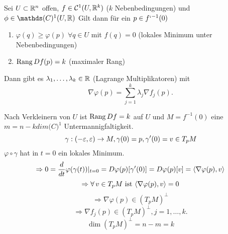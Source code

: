\documentclass[../ana2.tex]{subfiles}
\begin{document}
\begin{satz}
    Sei \( U \subset \mathbb{R}^n \) offen, \( f \in \mathcal{C}^1(U, \mathbb{R}^k) \) 
    (\(k\) Nebenbedingungen) und \(\phi \in \mathds(C)^1(U, \R)\)
    Gilt dann für ein \(p \in f`^{-1}(0)\)
    \begin{enumerate}
        \item \( \varphi(q) \geq \varphi(p) \;\forall q \in U \) mit
        \( f(q) = 0 \) (lokales Minimum unter Nebenbedingungen)
        \item \( \operatorname{Rang} Df (p) = k \) (maximaler Rang)
    \end{enumerate}
    Dann gibt es \( \lambda_1, \ldots, \lambda_k \in \mathbb{R} \) (Lagrange Multiplikatoren)
    mit 
    \[ \nabla \varphi(p) = \sum_{j=1}^k \lambda_j \nabla f_j(p). \]
\end{satz}
\begin{bew}
    Nach Verkleinern von \(U\) ist \(\operatorname{Rang} Df = k \) 
    auf \(U\) und \(M = f^{-1}(0)\) eine
    \(m=n-k dim \mathcal(C)^1\) Untermannigfaltigkeit.
    \[ \gamma:(-\varepsilon, \varepsilon)\rightarrow M, \gamma(0) = p, \gamma'(0) = v \in T_pM \]
    \( \varphi \circ \gamma \) hat in \( t = 0 \) ein lokales Minimum.
    \[ \Rightarrow 0 = \frac{d}{dt} \varphi(\gamma(t)) \vert_{t=0} 
    = D\varphi(p) [\gamma'(0)] = D\varphi(p)[v] 
    = \langle \nabla \varphi(p), v \rangle \]
    \[ \Rightarrow \forall v \in T_pM \text{ ist } 
    \scalarprod{\nabla \varphi(p)}{v} = 0 \]
    \[ \Rightarrow \nabla \varphi(p) \in (T_pM)^\bot \]    
    \[ \Rightarrow \nabla f_j(p) \in (T_p M)^\bot, j = 1,\ldots,k. \]
    \[ \dim(T_pM)^\bot = n-m = k \]
\end{bew}
\end{document}
